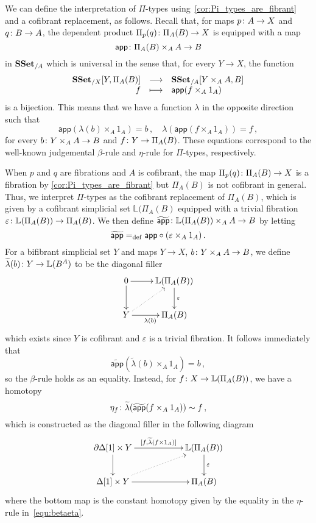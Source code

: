 \documentclass[reqno,10pt,a4paper,oneside,draft]{amsart}
\begin{document}
 
\begin{remark}  \label{rem:pi-types}
We can define the interpretation of $\Pi$-types using~\cref{cor:Pi_types_are_fibrant} and a cofibrant replacement, as follows. 
Recall that, for maps $p \colon A \to X$ and $q \colon B \to A$,  the dependent product $\Pi_p(q) \colon \Pi_A(B)
\to X$ is equipped with a map
\[
\mathsf{app} \colon \Pi_A(B) \times_A  A \to B
\] 
in $\mathbf{SSet}_{/A}$ which is universal in the sense that, for every  $Y \to X$, the function
\[
\begin{array}{rcl} 
 \mathbf{SSet}_{/X}[ Y , \Pi_A(B)] & \longrightarrow &  \mathbf{SSet}_{/A}[Y \times_A A, B]  \\
  f & \longmapsto & \mathsf{app}(f \times_A 1_A) 
  \end{array} 
 \]
 is a bijection. This means that we have a function $\lambda$ in the opposite direction such that  
 \begin{equation}
 \label{equ:betaeta}
 \mathsf{app}(\lambda(b) \times_A 1_A) = b   \, , \quad
 \lambda( \mathsf{app}(f \times_A 1_A)) = f \, ,
 \end{equation}
 for every $b \colon Y \times_A A \to B$ and $f \colon Y \to \Pi_A(B)$.  These equations correspond to the
 well-known judgemental $\beta$-rule and $\eta$-rule for $\Pi$-types, respectively.
 
 When $p$ and $q$ are fibrations and $A$ is cofibrant, the map 
 $\Pi_p(q) \colon \Pi_A(B) \to X$ is a fibration by \cref{cor:Pi_types_are_fibrant} but $\Pi_A(B)$ is not cofibrant
 in general. Thus, we interpret  $\Pi$-types as the 
 cofibrant replacement  of $\Pi_A(B)$, which is given by a cofibrant simplicial set
 $\mathbb{L}(\Pi_A(B)$  equipped with
 a trivial fibration $\varepsilon \colon \mathbb{L}(\Pi_A(B)) \to \Pi_A(B)$. 
We then define $\widetilde{\mathsf{app}} \colon   \mathbb{L}(\Pi_A(B)) \times_A A \to B$ by letting
\[
\widetilde{\mathsf{app}}  =_{\operatorname{def}} \mathsf{app} \circ (\varepsilon \times_A 1_A) \, .
\]
For a bifibrant simplicial set $Y$ and maps $Y \to X$,  $b \colon Y \times_A A \to B$, we define $\widetilde{\lambda}(b) \colon Y \to \mathbb{L}(B^A)$ to be the
diagonal filler
\[
\xymatrix{
0 \ar[r] \ar[d] & \mathbb{L}(\Pi_A(B))  \ar[d]^\varepsilon \\
Y \ar[r]_{\lambda(b)} \ar@{.>}[ur] & \Pi_A(B)}
\]
which exists since $Y$ is cofibrant and $\varepsilon$ is a trivial fibration. It follows immediately that
\[
 \widetilde{\mathsf{app}}(\widetilde{\lambda}(b) \times_A 1_A) = b \, ,
\]
so the $\beta$-rule holds as an equality. Instead, for $f \colon X \to \mathbb{L}(\Pi_A(B))$, we have a homotopy
\[
\eta_f  \colon \widetilde{\lambda}( \widetilde{\mathsf{app}}(f \times_A 1_A)) \sim  f  \, ,
\]
which is constructed as the diagonal filler in the following diagram
\[
\xymatrix@C=2cm{
\partial \Delta[1] \times Y \ar[r]^-{[f, \widetilde{\lambda}(f \times 1_A)]} \ar[d] & \mathbb{L}(\Pi_A(B)) \ar[d]^\varepsilon \\
\Delta[1] \times Y \ar[r] \ar@{.>}[ur] & \Pi_A(B) }
\]
where the bottom map is the constant homotopy given by the equality in the $\eta$-rule in~\eqref{equ:betaeta}.
\end{remark}
\end{document}
